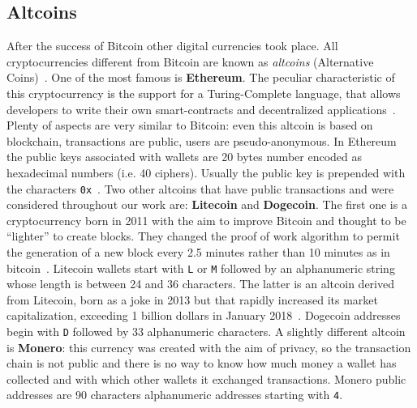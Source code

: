 \subsection{Altcoins}
After the success of Bitcoin other digital currencies took place.
All cryptocurrencies different from Bitcoin are known as 
\emph{altcoins} (Alternative Coins)~\cite{bib:bitcoinbeyond}.
One of the most famous is
\textbf{Ethereum}. The peculiar characteristic of this cryptocurrency is
the support for a Turing-Complete language, that allows developers to
write their own smart-contracts and decentralized
applications~\cite{bib:ethereum:whitepaper}.
Plenty of aspects are very similar to Bitcoin: even
this altcoin is based on blockchain, transactions are public, users are
pseudo-anonymous. In Ethereum the public keys associated with wallets are 20
bytes number encoded as hexadecimal numbers (i.e. 40 ciphers). Usually
the public key is prepended with the characters
\texttt{0x}~\cite{bib:ethereum:whitepaper}.
Two other altcoins that have public transactions and were considered
throughout our work are: \textbf{Litecoin} and \textbf{Dogecoin}.
The first one is a cryptocurrency born in 2011 with the aim to improve
Bitcoin and thought to be ``lighter'' to create blocks.
They changed the proof of work algorithm to permit the
generation of a new block every 2.5 minutes rather than 10 minutes as in
bitcoin~\cite{bib:litecoin:wiki}.
Litecoin wallets start with \texttt{L} or \texttt{M} followed by an
alphanumeric string whose length is between 24 and 36 characters.
The latter is an altcoin derived from Litecoin, born as a joke in 2013
but that rapidly increased its market capitalization, exceeding 1
billion dollars in January 2018~\cite{bib:dogecoin:marketcap}.
Dogecoin addresses begin with \texttt{D} followed by 33 alphanumeric
characters. A slightly different altcoin is \textbf{Monero}: this currency was
created with the aim of privacy, so the transaction chain is not public
and there is no way to know how much money a wallet has collected and
with which other wallets it exchanged transactions.
Monero public addresses are 90 characters alphanumeric addresses starting
with \texttt{4}.


